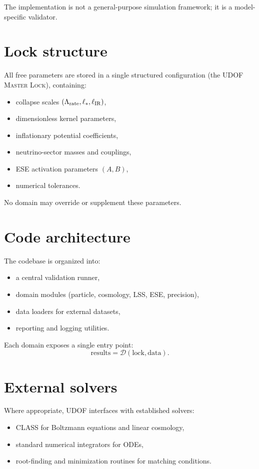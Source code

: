 \documentclass[11pt]{book}
\begin{document}
The implementation is not a general-purpose simulation framework; it is a
model-specific validator.

\section{Lock structure}

All free parameters are stored in a single structured configuration
(the \textsc{UDOF Master Lock}), containing:
\begin{itemize}
\item collapse scales $(\Lambda_{\rm rate}, \ell_\ast, \ell_{\rm IR})$,
\item dimensionless kernel parameters,
\item inflationary potential coefficients,
\item neutrino-sector masses and couplings,
\item ESE activation parameters $(A,B)$,
\item numerical tolerances.
\end{itemize}

No domain may override or supplement these parameters.

\section{Code architecture}

The codebase is organized into:
\begin{itemize}
\item a central validation runner,
\item domain modules (particle, cosmology, LSS, ESE, precision),
\item data loaders for external datasets,
\item reporting and logging utilities.
\end{itemize}

Each domain exposes a single entry point:
\begin{equation}
\mathrm{results} = \mathcal{D}(\mathrm{lock}, \mathrm{data}).
\end{equation}

\section{External solvers}

Where appropriate, UDOF interfaces with established solvers:
\begin{itemize}
\item CLASS for Boltzmann equations and linear cosmology,
\item standard numerical integrators for ODEs,
\item root-finding and minimization routines for matching conditions.
\end{itemize}
\end{document}

